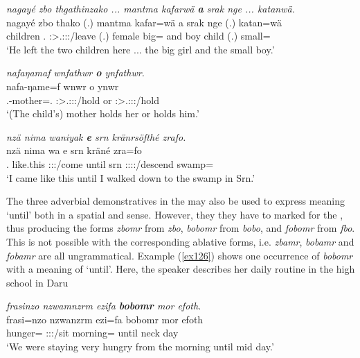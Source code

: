 \begin{exe}
	\ex \emph{nagayé zbo thgathinzako ... mantma kafarwä \textbf{a} srak nge ... katanwä.}\\
	\gll nagayé zbo thako (.) mantma kafar=wä a srak nge (.) katan=wä\\
	children \Prox{}.\All{} \Stsg:\Sbj>\Stdu.\Obj:\Pst:\Pfv:\Andat/leave (.) female big=\Emph{} and boy child (.) small=\Emph{}\\
	\trans `He left the two children here ... the big girl and the small boy.' 
	\label{ex123}
\end{exe}
\begin{exe}
	\ex \emph{nafaŋamaf wnfathwr \textbf{o} ynfathwr.}\\
	\gll nafa-ŋame=f wnwr o ynwr\\
	\Third.\Poss{}-mother=\Erg.\Sg{} \Stsg:\Sbj>\Tsg.\F:\Obj:\Nonpast:\Venit/hold or \Stsg:\Sbj>\Tsg.\Masc:\Obj:\Nonpast:\Venit/hold\\
	\trans `(The child's) mother holds her or holds him.' 
	\label{ex124}
\end{exe}
\begin{exe}
	\ex \emph{nzä nima waniyak \textbf{e} srn kränrsöfthé zrafo.}\\
	\gll nzä nima wa e srn kräné zra=fo\\
	\Fsg{}.\Abs{} {like.this} \Fsg:\Sbj:\Nonpast:\Ipfv/come until srn \Fsg:\Sbj:\Irr:\Pfv:\Venit/descend swamp=\All{}\\
	\trans `I came like this until I walked down to the swamp in Srn.'\\ 
	\label{ex125}
\end{exe}

The three adverbial demonstratives in the   may also be used to express meaning `until' both in a spatial and  sense. However, they they have to marked for the  , thus producing the forms \emph{zbomr} from \emph{zbo}, \emph{bobomr} from \emph{bobo}, and \emph{fobomr} from \emph{fbo}. This is not possible with the corresponding ablative forms, i.e. \emph{zbamr}, \emph{bobamr} and \emph{fobamr} are all ungrammatical. Example (\ref{ex126}) shows one occurrence of \emph{bobomr} with a  meaning of `until'. Here, the speaker describes her daily routine in the high school in Daru

\begin{exe}
	\ex \emph{frasinzo nzwamnzrm ezifa \textbf{bobomr} mor efoth.}\\
	\gll frasi=nzo nzwanzrm ezi=fa bobomr mor efoth\\
	hunger=\Only{} \Fpl:\Sbj:\Pst:\Dur/sit morning=\Abl{} until neck day\\
	\trans `We were staying very hungry from the morning until mid day.'\\ 
	\label{ex126}
\end{exe}

